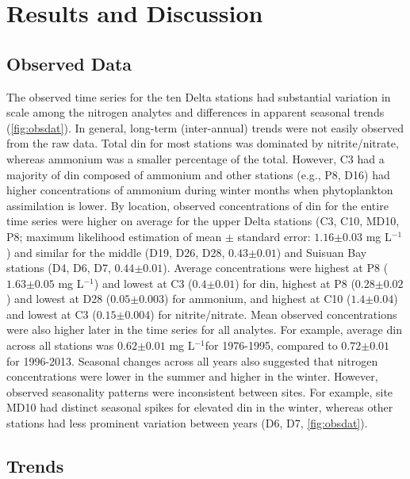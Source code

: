 \documentclass[journal = esthag, manuscript = article]{achemso}\usepackage[]{graphicx}\usepackage[]{color}
\newcommand{\mgl}{mg L$^{-1}$}
\begin{document}
\section{Results and Discussion}

\subsection{Observed Data}



The observed time series for the ten Delta stations had substantial variation in scale among the nitrogen analytes and differences in apparent seasonal trends (\cref{fig:obsdat}).  In general, long-term (inter-annual) trends were not easily observed from the raw data.  Total \ac{din} for most stations was dominated by nitrite/nitrate, whereas ammonium was a smaller percentage of the total.  However, C3 had a majority of \ac{din} composed of ammonium and other stations (e.g., P8, D16) had higher concentrations of ammonium during winter months when phytoplankton assimilation is lower\cite{Novick29}.  By location, observed concentrations of \ac{din} for the entire time series were higher on average for the upper Delta stations (C3, C10, MD10, P8; maximum likelihood estimation of mean $\pm$ standard error: $1.16$$\pm$$0.03$ \mgl) and similar for the middle (D19, D26, D28, $0.43$$\pm$$0.01$) and Suisuan Bay stations (D4, D6, D7, $0.44$$\pm$$0.01$).  Average concentrations were highest at P8 ($1.63$$\pm$$0.05$ \mgl) and lowest at C3 ($0.4$$\pm$$0.01$) for \ac{din}, highest at P8 ($0.28$$\pm$$0.02$) and lowest at D28 ($0.05$$\pm$$0.003$) for ammonium, and highest at C10 ($1.4$$\pm$$0.04$) and lowest at C3 ($0.15$$\pm$$0.004$) for nitrite/nitrate. Mean observed concentrations were also higher later in the time series for all analytes.  For example, average \ac{din} across all stations was $0.62$$\pm$$0.01$ \mgl for 1976-1995, compared to $0.72$$\pm$$0.01$ for 1996-2013. Seasonal changes across all years also suggested that nitrogen concentrations were lower in the summer and higher in the winter.  However, observed seasonality patterns were inconsistent between sites.  For example, site MD10 had distinct seasonal spikes for elevated \ac{din} in the winter, whereas other stations had less prominent variation between years (D6, D7, \cref{fig:obsdat}).  

\subsection{Trends}
\end{document}

